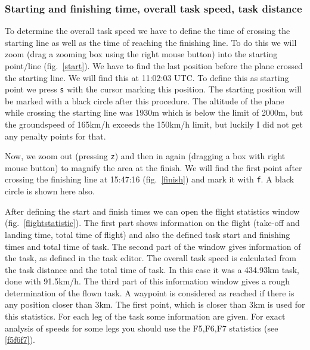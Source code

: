 \subsubsection{Starting and finishing time, overall task speed, task distance}
To determine the overall task speed we have to define the time of crossing the starting line as well as the time of reaching the finishing line.
To do this we will zoom (drag a zooming box using the right mouse button) into the starting point/line (fig.~\ref{start}).
We have to find the last position before the plane crossed the starting line.
We will find this at 11:02:03 UTC. To define this as starting point we press \texttt{s} with the cursor marking this position.
The starting position will be marked with a black circle after this procedure.
The altitude of the plane while crossing the starting line was 1930m which is below the limit of 2000m, but the groundspeed of 165km/h exceeds the 150km/h limit,
but luckily I did not get any penalty points for that.

Now, we zoom out (pressing \texttt{z}) and then in again (dragging a box with right mouse button) to magnify the area at the finish.
We will find the first point after crossing the finishing line at 15:47:16 (fig.~\ref{finish}) and mark it with \texttt{f}.
A black circle is shown here also.

After defining the start and finish times we can open the flight statistics window (fig.~\ref{flightstatistic}).
The first part shows information on the flight (take-off and landing time,
total time of flight) and also the defined task start and finishing times and total time of task.
The second part of the window gives information of the task, as defined in the task editor.
The overall task speed is calculated from the task distance and the total time of task.
In this case it was a 434.93km task, done with 91.5km/h. The third part of this information window gives a rough determination of the flown task.
A waypoint is considered as reached if there is any position closer than 3km.
The first point, which is closer than 3km is used for this statistics.
For each leg of the task some information are given. For exact analysis of speeds for some legs you should use the F5,F6,F7 statistics (see \ref{f5f6f7}).

